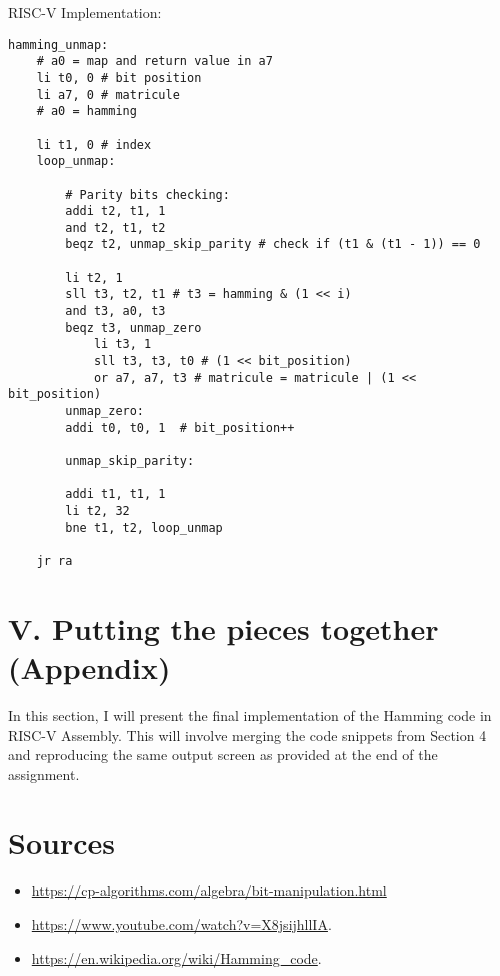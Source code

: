 \documentclass[11pt]{article}
\begin{document}
RISC-V Implementation:

\begin{lstlisting}[language=RISC-V]
hamming_unmap:
    # a0 = map and return value in a7
    li t0, 0 # bit position
    li a7, 0 # matricule
    # a0 = hamming 

    li t1, 0 # index
    loop_unmap: 

        # Parity bits checking:
        addi t2, t1, 1
        and t2, t1, t2
        beqz t2, unmap_skip_parity # check if (t1 & (t1 - 1)) == 0

        li t2, 1
        sll t3, t2, t1 # t3 = hamming & (1 << i)
        and t3, a0, t3 
        beqz t3, unmap_zero
            li t3, 1  
            sll t3, t3, t0 # (1 << bit_position)
            or a7, a7, t3 # matricule = matricule | (1 << bit_position)
        unmap_zero: 
        addi t0, t0, 1  # bit_position++

        unmap_skip_parity: 

        addi t1, t1, 1 
        li t2, 32
        bne t1, t2, loop_unmap

    jr ra
\end{lstlisting}


\section*{V. Putting the pieces together (Appendix)}
In this section, I will present the final implementation of the Hamming code in RISC-V Assembly. This will involve merging the code snippets from Section 4 and reproducing the same output screen as provided at the end of the assignment.



\newpage
\section*{Sources}
\begin{itemize}
    \item \url{https://cp-algorithms.com/algebra/bit-manipulation.html}
    \item \url{https://www.youtube.com/watch?v=X8jsijhllIA}.
    \item \url{https://en.wikipedia.org/wiki/Hamming_code}.
\end{itemize}
\end{document}
